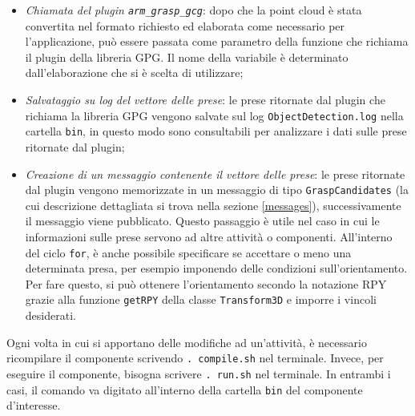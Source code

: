\documentclass{report}
\begin{document}
\begin{itemize}
\item \textit{Chiamata del plugin \texttt{arm\_grasp\_gcg}}: dopo che la point cloud è stata convertita nel formato richiesto ed elaborata come necessario per l'applicazione, può essere passata come parametro della funzione che richiama il plugin della libreria GPG. Il nome della variabile è determinato dall'elaborazione che si è scelta di utilizzare;
\item \textit{Salvataggio su log del vettore delle prese}: le prese ritornate dal plugin che richiama la libreria GPG vengono salvate sul log \texttt{ObjectDetection.log} nella cartella \texttt{bin}, in questo modo sono consultabili per analizzare i dati sulle prese ritornate dal plugin;
\item \textit{Creazione di un messaggio contenente il vettore delle prese}: le prese ritornate dal plugin vengono memorizzate in un messaggio di tipo \texttt{GraspCandidates} (la cui descrizione dettagliata si trova nella sezione \ref{messages}), successivamente il messaggio viene pubblicato. Questo passaggio è utile nel caso in cui le informazioni sulle prese servono ad altre attività o componenti. All'interno del ciclo \texttt{for}, è anche possibile specificare se accettare o meno una determinata presa, per esempio imponendo delle condizioni sull'orientamento. Per fare questo, si può ottenere l'orientamento secondo la notazione RPY grazie alla funzione \texttt{getRPY} della classe \texttt{Transform3D} e imporre i vincoli desiderati.
\end{itemize}
Ogni volta in cui si apportano delle modifiche ad un'attività, è necessario ricompilare il componente scrivendo \texttt{.~compile.sh} nel terminale. Invece, per eseguire il componente, bisogna scrivere \texttt{.~run.sh} nel terminale. In entrambi i casi, il comando va digitato all'interno della cartella \texttt{bin} del componente d'interesse.
\end{document}
